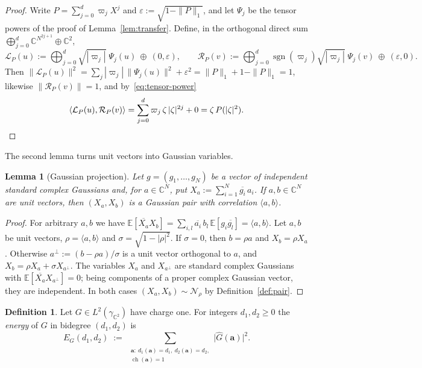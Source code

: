 \documentclass[11pt,reqno]{amsart}
\newtheorem{lemma}[theorem]{Lemma}
\theoremstyle{definition}
\newtheorem{definition}[theorem]{Definition}
\numberwithin{equation}{section}
\newcommand{\C}{\mathbb{C}}
\newcommand{\E}{\mathbb{E}}
\newcommand{\gCC}{\gamma_{\C^2}}
\newcommand{\lone}[1]{\|#1\|_1}
\begin{document}
\begin{proof}
Write $P=\sum_{j=0}^{d}\varpi_j X^j$ and $\varepsilon:=\sqrt{1-\lone{P}}$, and let $\Psi_j$ be the tensor powers of the proof of Lemma~\ref{lem:transfer}. Define, in the orthogonal direct sum $\bigoplus_{j=0}^d\C^{N^{2j+1}}\oplus\C^2$,
\[
  \mathcal{L}_P(u):=\bigoplus_{j=0}^d\sqrt{|\varpi_j|}\;\Psi_j(u)\ \oplus\ (0,\varepsilon),
  \qquad
  \mathcal{R}_P(v):=\bigoplus_{j=0}^d\operatorname{sgn}(\varpi_j)\sqrt{|\varpi_j|}\;\Psi_j(v)\ \oplus\ (\varepsilon,0).
\]
Then $\|\mathcal{L}_P(u)\|^2=\sum_j|\varpi_j|\,\|\Psi_j(u)\|^2+\varepsilon^2=\lone{P}+1-\lone{P}=1$, likewise $\|\mathcal{R}_P(v)\|=1$, and by~\eqref{eq:tensor-power}
\[
  \langle \mathcal{L}_P(u),\mathcal{R}_P(v)\rangle=\sum_{j=0}^d\varpi_j\,\zeta\,|\zeta|^{2j}+0=\zeta\,P(|\zeta|^2). \qedhere
\]
\end{proof}

The second lemma turns unit vectors into Gaussian variables.

\begin{lemma}[Gaussian projection]\label{lem:proj}
Let $g=(g_1,\dots,g_{N})$ be a vector of independent standard complex Gaussians and, for $a\in\C^{N}$, put $X_a:=\sum_{i=1}^{N}\overline{g_i}\,a_i$. If $a,b\in\C^N$ are unit vectors, then $(X_a,X_b)$ is a Gaussian pair with correlation $\langle a,b\rangle$.
\end{lemma}

\begin{proof}
For arbitrary $a,b$ we have $\E[\overline{X_a}X_b]=\sum_{i,l}\overline{a_i}\,b_l\,\E[g_i\overline{g_l}]=\langle a,b\rangle$. Let $a,b$ be unit vectors, $\rho=\langle a,b\rangle$ and $\sigma=\sqrt{1-|\rho|^2}$. If $\sigma=0$, then $b=\rho a$ and $X_b=\rho X_a$. Otherwise $a^\perp:=(b-\rho a)/\sigma$ is a unit vector orthogonal to $a$, and $X_b=\rho X_a+\sigma X_{a^\perp}$. The variables $X_a$ and $X_{a^\perp}$ are standard complex Gaussians with $\E[\overline{X_a}X_{a^\perp}]=0$; being components of a proper complex Gaussian vector, they are independent. In both cases $(X_a,X_b)\sim\mathcal{N}_\rho$ by Definition~\ref{def:pair}.
\end{proof}

\begin{definition}\label{def:energy}
Let $G\in L^2(\gCC)$ have charge one. For integers $d_1,d_2\ge0$ the \emph{energy} of $G$ in bidegree $(d_1,d_2)$ is
\[
  E_G(d_1, d_2) \;:=\; \sum_{\substack{\mathbf{a}:\ d_1(\mathbf{a})=d_1,\ d_2(\mathbf{a})=d_2,\\ \operatorname{ch}(\mathbf{a})=1}}
  \bigl|\widehat{G}(\mathbf{a})\bigr|^2 .
\]
\end{definition}
\end{document}
